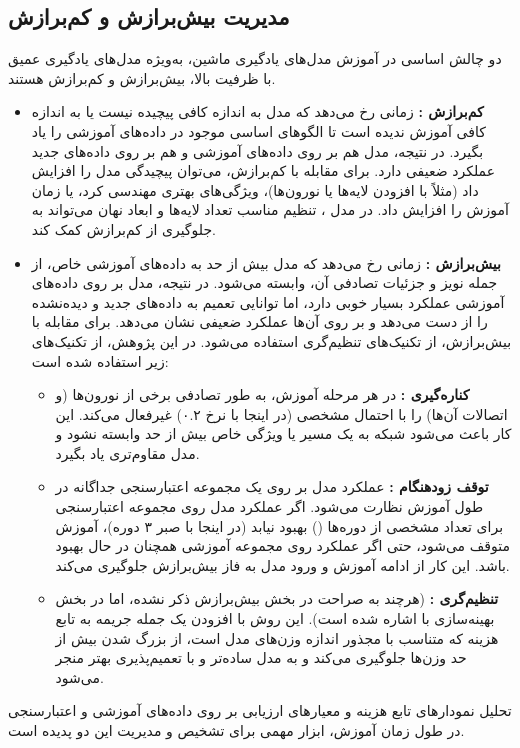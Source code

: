 \subsection{مدیریت بیش‌برازش و کم‌برازش}
دو چالش اساسی در آموزش مدل‌های یادگیری ماشین، به‌ویژه مدل‌های یادگیری عمیق با ظرفیت بالا، بیش‌برازش  و کم‌برازش  هستند.

\begin{itemize}
    \renewcommand{\labelitemi}{\lr{$\bullet$}}
    \item \textbf{کم‌برازش :} زمانی رخ می‌دهد که مدل به اندازه کافی پیچیده نیست یا به اندازه کافی آموزش ندیده است تا الگوهای اساسی موجود در داده‌های آموزشی را یاد بگیرد. در نتیجه، مدل هم بر روی داده‌های آموزشی و هم بر روی داده‌های جدید عملکرد ضعیفی دارد. برای مقابله با کم‌برازش، می‌توان پیچیدگی مدل را افزایش داد (مثلاً با افزودن لایه‌ها یا نورون‌ها)، ویژگی‌های بهتری مهندسی کرد، یا زمان آموزش را افزایش داد. در مدل ، تنظیم مناسب تعداد لایه‌ها  و ابعاد نهان  می‌تواند به جلوگیری از کم‌برازش کمک کند.
    \item \textbf{بیش‌برازش :} زمانی رخ می‌دهد که مدل بیش از حد به داده‌های آموزشی خاص، از جمله نویز و جزئیات تصادفی آن، وابسته می‌شود. در نتیجه، مدل بر روی داده‌های آموزشی عملکرد بسیار خوبی دارد، اما توانایی تعمیم به داده‌های جدید و دیده‌نشده را از دست می‌دهد و بر روی آن‌ها عملکرد ضعیفی نشان می‌دهد. برای مقابله با بیش‌برازش، از تکنیک‌های تنظیم‌گری  استفاده می‌شود. در این پژوهش، از تکنیک‌های زیر استفاده شده است:
    \begin{itemize}
        \renewcommand{\labelitemii}{\lr{$\bullet$}}
        \item \textbf{کناره‌گیری :} در هر مرحله آموزش، به طور تصادفی برخی از نورون‌ها (و اتصالات آن‌ها) را با احتمال مشخصی (در اینجا با نرخ ۰.۲) غیرفعال می‌کند. این کار باعث می‌شود شبکه به یک مسیر یا ویژگی خاص بیش از حد وابسته نشود و مدل مقاوم‌تری یاد بگیرد.
        \item \textbf{توقف زودهنگام :} عملکرد مدل بر روی یک مجموعه اعتبارسنجی جداگانه در طول آموزش نظارت می‌شود. اگر عملکرد مدل روی مجموعه اعتبارسنجی برای تعداد مشخصی از دوره‌ها () بهبود نیابد (در اینجا با صبر ۳ دوره)، آموزش متوقف می‌شود، حتی اگر عملکرد روی مجموعه آموزشی همچنان در حال بهبود باشد. این کار از ادامه آموزش و ورود مدل به فاز بیش‌برازش جلوگیری می‌کند.
        \item \textbf{تنظیم‌گری  :} (هرچند به صراحت در بخش بیش‌برازش ذکر نشده، اما در بخش بهینه‌سازی  با  اشاره شده است). این روش با افزودن یک جمله جریمه به تابع هزینه که متناسب با مجذور اندازه وزن‌های مدل است، از بزرگ شدن بیش از حد وزن‌ها جلوگیری می‌کند و به مدل ساده‌تر و با تعمیم‌پذیری بهتر منجر می‌شود.
    \end{itemize}
\end{itemize}
تحلیل نمودارهای تابع هزینه و معیارهای ارزیابی بر روی داده‌های آموزشی و اعتبارسنجی در طول زمان آموزش، ابزار مهمی برای تشخیص و مدیریت این دو پدیده است.

